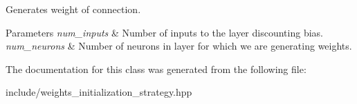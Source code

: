 Generates weight of connection. 


\begin{DoxyParams}{Parameters}
{\em num\+\_\+inputs} & Number of inputs to the layer discounting bias. \\
\hline
{\em num\+\_\+neurons} & Number of neurons in layer for which we are generating weights. \\
\hline
\end{DoxyParams}


The documentation for this class was generated from the following file\+:\begin{DoxyCompactItemize}
\item 
include/weights\+\_\+initialization\+\_\+strategy.\+hpp\end{DoxyCompactItemize}
